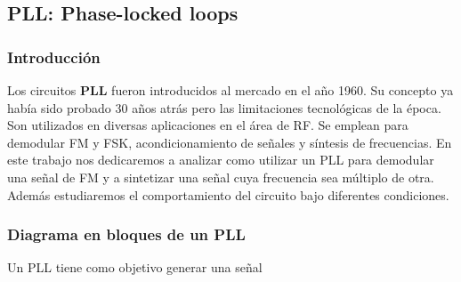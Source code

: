 

	\subsection{PLL: Phase-locked loops}
	\subsubsection{Introducción}
	Los circuitos \textbf{PLL} fueron introducidos al mercado en el año 1960. Su concepto ya había sido probado 30 años atrás pero las limitaciones tecnológicas de la época. Son utilizados en diversas aplicaciones en el área de RF. Se emplean para demodular FM y FSK, acondicionamiento de señales y síntesis de frecuencias. En este trabajo nos dedicaremos a analizar como utilizar un PLL para demodular una señal de FM y a sintetizar una señal cuya frecuencia sea múltiplo de otra. Además estudiaremos el comportamiento del circuito bajo diferentes condiciones.
	
	\subsubsection{Diagrama en bloques de un PLL}
	Un PLL tiene como objetivo generar una señal 

